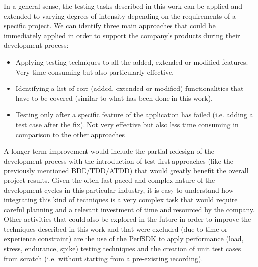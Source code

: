 In a general sense, the testing tasks described in this work can be applied and extended to varying degrees of intensity depending on the requirements of a specific project. We can identify three main approaches that could be immediately applied in order to support the company's products during their development process:
\begin{itemize}
    \item Applying testing techniques to all the added, extended or modified features. Very time consuming but also particularly effective.
    \item Identifying a list of core (added, extended or modified) functionalities that have to be covered (similar to what has been done in this work). 
    \item Testing only after a specific feature of the application has failed (i.e. adding a test case after the fix). Not very effective but also less time consuming in comparison to the other approaches 
\end{itemize}
A longer term improvement would include the partial redesign of the development process with the introduction of test-first approaches (like the previously mentioned BDD/TDD/ATDD) that would greatly benefit the overall project results. Given the often fast paced and complex nature of the development cycles in this particular industry, it is easy to understand how integrating this kind of techniques is a very complex task that would require careful planning and a relevant investment of time and resourced by the company.
Other activities that could also be explored in the future in order to improve the techniques described in this work and that were excluded (due to time or experience constraint) are the use of the PerfSDK to apply performance (load, stress, endurance, spike) testing techniques and the creation of unit test cases from scratch (i.e. without starting from a pre-existing recording).